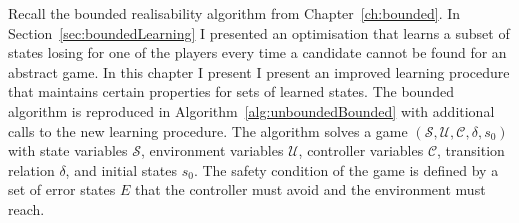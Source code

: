
Recall the bounded realisability algorithm from Chapter~\ref{ch:bounded}. In Section~\ref{sec:boundedLearning} I presented an optimisation that learns a subset of states losing for one of the players every time a candidate cannot be found for an abstract game. In this chapter I present I present an improved learning procedure that maintains certain properties for sets of learned states.  The bounded algorithm is reproduced in Algorithm~\ref{alg:unboundedBounded} with additional calls to the new learning procedure. The algorithm solves a game $(\mathcal{S}, \mathcal{U}, \mathcal{C}, \delta, s_0)$ with state variables $\mathcal{S}$, environment variables $\mathcal{U}$, controller variables $\mathcal{C}$, transition relation $\delta$, and initial states $s_0$. The safety condition of the game is defined by a set of error states $E$ that the controller must avoid and the environment must reach. 

